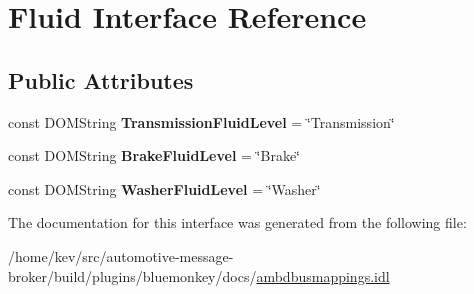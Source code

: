 \hypertarget{interfaceFluid}{\section{Fluid Interface Reference}
\label{interfaceFluid}
}
\subsection*{Public Attributes}
\begin{DoxyCompactItemize}
\item 
\hypertarget{interfaceFluid_a6dfdefaa8d5ea2b2d13e99f4f9b8c642}{const D\+O\+M\+String {\bfseries Transmission\+Fluid\+Level} = \char`\"{}Transmission\char`\"{}}\label{interfaceFluid_a6dfdefaa8d5ea2b2d13e99f4f9b8c642}

\item 
\hypertarget{interfaceFluid_a7514f249a3ca04b7d912b34499a7c7b2}{const D\+O\+M\+String {\bfseries Brake\+Fluid\+Level} = \char`\"{}Brake\char`\"{}}\label{interfaceFluid_a7514f249a3ca04b7d912b34499a7c7b2}

\item 
\hypertarget{interfaceFluid_aae5235a67d088bd771525f3cef6136ee}{const D\+O\+M\+String {\bfseries Washer\+Fluid\+Level} = \char`\"{}Washer\char`\"{}}\label{interfaceFluid_aae5235a67d088bd771525f3cef6136ee}

\end{DoxyCompactItemize}


The documentation for this interface was generated from the following file\+:\begin{DoxyCompactItemize}
\item 
/home/kev/src/automotive-\/message-\/broker/build/plugins/bluemonkey/docs/\hyperlink{ambdbusmappings_8idl}{ambdbusmappings.\+idl}\end{DoxyCompactItemize}
